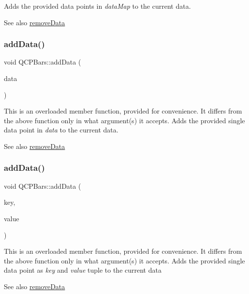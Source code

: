Adds the provided data points in {\itshape data\+Map} to the current data. \begin{DoxySeeAlso}{See also}
\mbox{\hyperlink{class_q_c_p_bars_a1fe9bcb57d670defea1bb65cadf43765}{remove\+Data}} 
\end{DoxySeeAlso}
\mbox{\label{class_q_c_p_bars_a142158b1addefd53259002dd3ab22c3a}} 
\subsubsection{\texorpdfstring{add\+Data()}{addData()}\hspace{0.1cm}{\footnotesize\ttfamily [2/4]}}
{\footnotesize\ttfamily void Q\+C\+P\+Bars\+::add\+Data (\begin{DoxyParamCaption}\item[{const \mbox{\hyperlink{class_q_c_p_bar_data}{Q\+C\+P\+Bar\+Data}} \&}]{data }\end{DoxyParamCaption})}

This is an overloaded member function, provided for convenience. It differs from the above function only in what argument(s) it accepts. Adds the provided single data point in {\itshape data} to the current data. \begin{DoxySeeAlso}{See also}
\mbox{\hyperlink{class_q_c_p_bars_a1fe9bcb57d670defea1bb65cadf43765}{remove\+Data}} 
\end{DoxySeeAlso}
\mbox{\label{class_q_c_p_bars_a684dd105403a5497fda42f2094fecbb7}} 
\subsubsection{\texorpdfstring{add\+Data()}{addData()}\hspace{0.1cm}{\footnotesize\ttfamily [3/4]}}
{\footnotesize\ttfamily void Q\+C\+P\+Bars\+::add\+Data (\begin{DoxyParamCaption}\item[{double}]{key,  }\item[{double}]{value }\end{DoxyParamCaption})}

This is an overloaded member function, provided for convenience. It differs from the above function only in what argument(s) it accepts. Adds the provided single data point as {\itshape key} and {\itshape value} tuple to the current data \begin{DoxySeeAlso}{See also}
\mbox{\hyperlink{class_q_c_p_bars_a1fe9bcb57d670defea1bb65cadf43765}{remove\+Data}} 
\end{DoxySeeAlso}
\mbox{\label{class_q_c_p_bars_a3679a0a9decab0fa03f8f4c6e3344d52}} 
